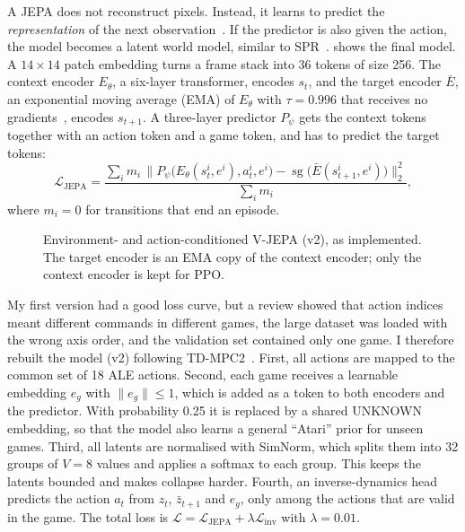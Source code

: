 \documentclass[runningheads]{llncs}
\begin{document}
A JEPA does not reconstruct pixels. Instead, it learns to predict the \emph{representation}
of the next observation~\cite{lecun2022path}. If the predictor is also given the action, the
model becomes a latent world model, similar to SPR~\cite{schwarzer2021spr}. 
shows the final model. A $14\times14$ patch embedding turns a frame stack into 36 tokens of
size 256. The context encoder $E_\theta$, a six-layer transformer, encodes $s_t$, and the
target encoder $\bar E$, an exponential moving average (EMA) of $E_\theta$ with $\tau=0.996$
that receives no gradients~\cite{assran2023ijepa}, encodes $s_{t+1}$. A three-layer predictor
$P_\psi$ gets the context tokens together with an action token and a game token, and has to
predict the target tokens:
\begin{equation}
  \mathcal{L}_{\text{JEPA}}=\frac{\sum_i m_i\,\big\|P_\psi\big(E_\theta(s_t^i,e^i),a_t^i,e^i\big)
  -\operatorname{sg}\big(\bar E(s_{t+1}^i,e^i)\big)\big\|_2^2}{\sum_i m_i},
\end{equation}
where $m_i=0$ for transitions that end an episode.

\begin{figure}[!htbp]
\centering

\caption{Environment- and action-conditioned V-JEPA (v2), as implemented. The target
encoder is an EMA copy of the context encoder; only the context encoder is kept for PPO.}
\label{fig:jepa}
\end{figure}

My first version had a good loss curve, but a review showed that action indices meant
different commands in different games, the large dataset was loaded with the wrong axis order,
and the validation set contained only one game.
I therefore rebuilt the model (v2) following TD-MPC2~\cite{hansen2024tdmpc2}. First, all actions are mapped to the common set of 18 ALE actions. Second, each game
receives a learnable embedding $e_g$ with $\|e_g\|\le1$, which is added as a token to both
encoders and the predictor. With probability 0.25 it is replaced by a shared UNKNOWN
embedding, so that the model also learns a general ``Atari'' prior for unseen games. Third, all
latents are normalised with SimNorm, which splits them into 32 groups of $V=8$ values and
applies a softmax to each group. This keeps the latents bounded and makes collapse harder. Fourth,
an inverse-dynamics head~\cite{pathak2017icm} predicts the action $a_t$ from $z_t$,
$\bar z_{t+1}$ and $e_g$, only among the actions that are valid in the game. The total loss is
$\mathcal{L}=\mathcal{L}_{\text{JEPA}}+\lambda\mathcal{L}_{\text{inv}}$ with $\lambda=0.01$.
\end{document}
